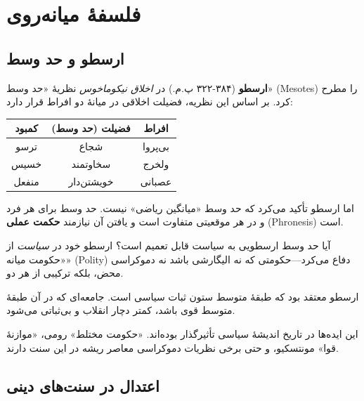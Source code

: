 \section{فلسفهٔ میانه‌روی}

\subsection{ارسطو و حد وسط}

\begin{tcolorbox}[
    enhanced,
    colback=goldaccent!10,
    colframe=goldaccent,
    boxrule=1.5pt,
    arc=5pt,
    fonttitle=\bfseries,
    title={\rl{🟡 زمینهٔ فلسفی: نظریهٔ حد وسط ارسطو}}
]
\textbf{ارسطو} (۳۸۴-۳۲۲ پ.م.) در \textit{اخلاق نیکوماخوس} نظریهٔ «حد وسط» (Mesotes) را مطرح کرد. بر اساس این نظریه، فضیلت اخلاقی در میانهٔ دو افراط قرار دارد:

\begin{center}
\begin{tabular}{ccc}
\textbf{کمبود} & \textbf{فضیلت (حد وسط)} & \textbf{افراط} \\
\hline
ترسو & شجاع & بی‌پروا \\
خسیس & سخاوتمند & ولخرج \\
منفعل & خویشتن‌دار & عصبانی \\
\end{tabular}
\end{center}

اما ارسطو تأکید می‌کرد که حد وسط «میانگین ریاضی» نیست. حد وسط برای هر فرد و در هر موقعیتی متفاوت است و یافتن آن نیازمند \textbf{حکمت عملی} (Phronesis) است.
\end{tcolorbox}


آیا حد وسط ارسطویی به سیاست قابل تعمیم است؟ ارسطو خود در \textit{سیاست} از «حکومت میانه» (Polity) دفاع می‌کرد—حکومتی که نه الیگارشی باشد نه دموکراسی محض، بلکه ترکیبی از هر دو.

ارسطو معتقد بود که طبقهٔ متوسط ستون ثبات سیاسی است. جامعه‌ای که در آن طبقهٔ متوسط قوی باشد، کمتر دچار انقلاب و بی‌ثباتی می‌شود.

این ایده‌ها در تاریخ اندیشهٔ سیاسی تأثیرگذار بوده‌اند. «حکومت مختلط» رومی، «موازنهٔ قوا» مونتسکیو، و حتی برخی نظریات دموکراسی معاصر ریشه در این سنت دارند.


\subsection{اعتدال در سنت‌های دینی}


